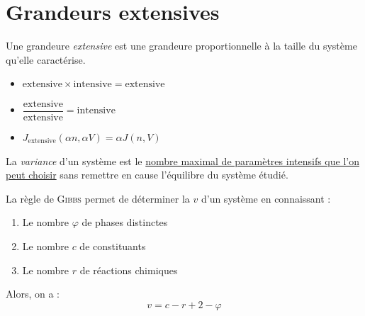 \documentclass[11pt,a4paper,fleqn,pdftex]{report}
\begin{document}
\section{Grandeurs extensives}
\begin{dfn}
  Une grandeure \emph{extensive} est une grandeure proportionnelle à la taille du système qu'elle caractérise.
\end{dfn}
%
\begin{prop}
  \begin{itemize}[label=$\bullet$]
   \item $\mathrm{extensive}\times \mathrm{intensive}= \mathrm{extensive}$ \\
   \item $\dfrac{\mathrm{extensive}}{\mathrm{extensive}}= \mathrm{intensive}$ \\
   \item $J_\mathrm{extensive}\left( \alpha n, \alpha V \right) = \alpha J(n,V)$
  \end{itemize}
\end{prop}
%
\needspace{4cm}
\begin{dfn}[Variance]
  La \emph{variance} d'un système est le \uline{nombre maximal de paramètres intensifs que l'on peut choisir} sans remettre en cause l'équilibre du système étudié.
\end{dfn}
\begin{itheorem}
  La règle de \textsc{Gibbs} permet de déterminer la  $v$ d'un système en connaissant : 
  \renewcommand{\theenumi}{\roman{enumi}}%
  \begin{enumerate}
    \item Le nombre $\varphi$ de phases distinctes
    \item Le nombre $c$ de constituants
    \item Le nombre $r$ de réactions chimiques
  \end{enumerate}
  Alors, on a : 
  \begin{equation}
  v = c - r + 2 - \varphi
  \end{equation}
\end{itheorem}
\end{document}
